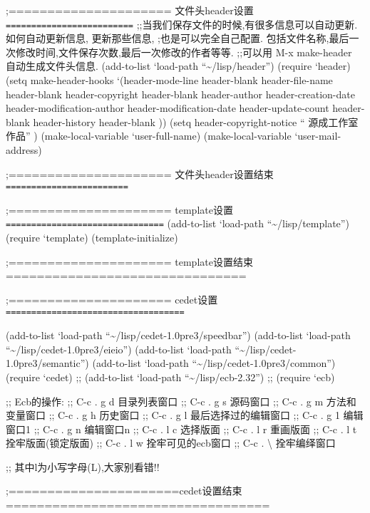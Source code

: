 \documentclass[11pt]{article}
\begin{document}
\begin{itemize}
;===================== 文件头header设置 \texttt{=========================}
;;当我们保存文件的时候,有很多信息可以自动更新.如何自动更新信息, 更新那些信息,
;也是可以完全自己配置. 包括文件名称,最后一次修改时间,文件保存次数,最后一次修改的作者等等.
;;可以用 M-x make-header 自动生成文件头信息. 
(add-to-list `load-path  ``\~{}/lisp/header'')
(require `header)
(setq make-header-hooks `(header-mode-line
                            header-blank
                            header-file-name
                            header-blank
                            header-copyright
                            header-blank
                            header-author
                            header-creation-date
                            header-modification-author
                            header-modification-date
                            header-update-count
                            header-blank
                            header-history
                            header-blank
                            ))
(setq header-copyright-notice ``  源成工作室 作品'' )
(make-local-variable `user-full-name)
(make-local-variable `user-mail-address)

;===================== 文件头header设置结束 \texttt{========================}


;===================== template设置 \texttt{===============================}
(add-to-list `load-path  ``\~{}/lisp/template'')
(require `template)
(template-initialize)

;===================== template设置结束===============================

;===================== cedet设置 \texttt{===================================}

(add-to-list `load-path ``\~{}/lisp/cedet-1.0pre3/speedbar'')
(add-to-list `load-path ``\~{}/lisp/cedet-1.0pre3/eieio'')
(add-to-list `load-path ``\~{}/lisp/cedet-1.0pre3/semantic'')
(add-to-list `load-path ``\~{}/lisp/cedet-1.0pre3/common'')
(require `cedet)
;; (add-to-list `load-path ``\~{}/lisp/ecb-2.32'')
;; (require `ecb)

;; Ecb的操作:
;; C-c . g d 目录列表窗口
;; C-c . g s 源码窗口
;; C-c . g m 方法和变量窗口
;; C-c . g h 历史窗口
;; C-c . g l 最后选择过的编辑窗口
;; C-c . g 1 编辑窗口1
;; C-c . g n 编辑窗口n
;; C-c . l c 选择版面
;; C-c . l r 重画版面
;; C-c . l t 拴牢版面(锁定版面)
;; C-c . l w 拴牢可见的ecb窗口
;; C-c . \textbackslash{}   拴牢编绎窗口

;; 其中l为小写字母(L),大家别看错!!

;======================cedet设置结束==================================


\end{itemize}
\end{document}
